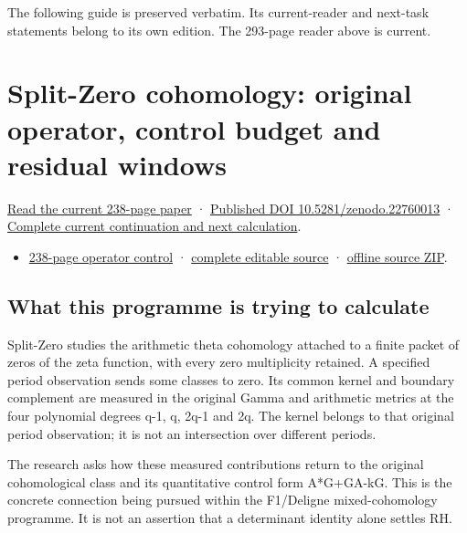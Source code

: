\documentclass[
]{article}
\providecommand{\tightlist}{%
  \setlength{\itemsep}{0pt}\setlength{\parskip}{0pt}}
\begin{document}
The following guide is preserved verbatim. Its current-reader and
next-task statements belong to its own edition. The 293-page reader
above is current.

\section{Split-Zero cohomology: original operator, control budget and
residual
windows}\label{split-zero-cohomology-original-operator-control-budget-and-residual-windows}

\href{https://zenodo.org/api/records/22760013/files/63-operator-control-reader.pdf/content}{Read
the current 238-page paper} ·
\href{https://doi.org/10.5281/zenodo.22760013}{Published DOI
10.5281/zenodo.22760013} ·
\href{https://github.com/KokunoYumeto/zeta-function-research-reader/blob/36b2654e1d3324c6de24e324ec34bb3a98f67103/workbenches/splitzero-tandem/continuations/20260915-operator-control-continuation/00_CONTINUE_HERE.md}{Complete
current continuation and next calculation}.

\begin{itemize}
\tightlist
\item
  \href{https://zenodo.org/api/records/22760013/files/63-operator-control-reader.pdf/content}{238-page
  operator control} ·
  \href{https://github.com/KokunoYumeto/zeta-function-research-reader/tree/36b2654e1d3324c6de24e324ec34bb3a98f67103/workbenches/splitzero-tandem/continuations/20260915-operator-control-continuation}{complete
  editable source} ·
  \href{https://zenodo.org/api/records/22760013/files/64-operator-control-sources.zip/content}{offline
  source ZIP}.
\end{itemize}

\subsection{What this programme is trying to
calculate}\label{what-this-programme-is-trying-to-calculate-1}

Split-Zero studies the arithmetic theta cohomology attached to a finite
packet of zeros of the zeta function, with every zero multiplicity
retained. A specified period observation sends some classes to zero. Its
common kernel and boundary complement are measured in the original Gamma
and arithmetic metrics at the four polynomial degrees q-1, q, 2q-1 and
2q. The kernel belongs to that original period observation; it is not an
intersection over different periods.

The research asks how these measured contributions return to the
original cohomological class and its quantitative control form
A*G+GA-kG. This is the concrete connection being pursued within the
F1/Deligne mixed-cohomology programme. It is not an assertion that a
determinant identity alone settles RH.
\end{document}
